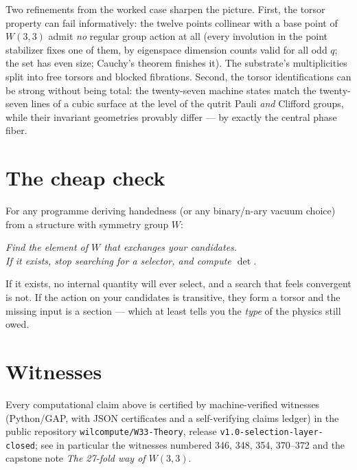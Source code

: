 \documentclass[11pt]{article}
\begin{document}
Two refinements from the worked case sharpen the picture. First, the torsor
property can fail informatively: the twelve points collinear with a base point
of $W(3,3)$ admit \emph{no} regular group action at all (every involution in
the point stabilizer fixes one of them, by eigenspace dimension counts valid
for all odd $q$; the set has even size; Cauchy's theorem finishes it). The
substrate's multiplicities split into free torsors and blocked fibrations.
Second, the torsor identifications can be strong without being total: the
twenty-seven machine states match the twenty-seven lines of a cubic surface at
the level of the qutrit Pauli \emph{and} Clifford groups, while their invariant
geometries provably differ --- by exactly the central phase fiber.

\section{The cheap check}\label{sec:check}

For any programme deriving handedness (or any binary/n-ary vacuum choice) from
a structure with symmetry group $W$:
\begin{center}
\emph{Find the element of $W$ that exchanges your candidates.\\
If it exists, stop searching for a selector, and compute $\det$.}
\end{center}
If it exists, no internal quantity will ever select, and a search that feels
convergent is not. If the action on your candidates is transitive, they form a
torsor and the missing input is a section --- which at least tells you the
\emph{type} of the physics still owed.

\section{Witnesses}\label{sec:witness}

Every computational claim above is certified by machine-verified witnesses
(Python/GAP, with JSON certificates and a self-verifying claims ledger) in the
public repository \texttt{wilcompute/W33-Theory}, release
\texttt{v1.0-selection-layer-closed}; see in particular the witnesses numbered
346, 348, 354, 370--372 and the capstone note \emph{The 27-fold way of
$W(3,3)$}.
\end{document}
